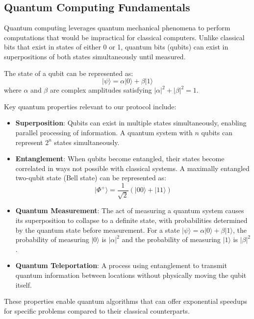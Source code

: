 \documentclass[11pt,a4paper]{article}
\begin{document}
\subsection{Quantum Computing Fundamentals}
Quantum computing leverages quantum mechanical phenomena to perform computations that would be impractical for classical computers. Unlike classical bits that exist in states of either 0 or 1, quantum bits (\glspl{qubit}) can exist in superpositions of both states simultaneously until measured.

The state of a \gls{qubit} can be represented as:
\begin{equation}
|\psi\rangle = \alpha|0\rangle + \beta|1\rangle
\end{equation}
where $\alpha$ and $\beta$ are complex amplitudes satisfying $|\alpha|^2 + |\beta|^2 = 1$.

Key quantum properties relevant to our protocol include:

\begin{itemize}
    \item \textbf{Superposition}: Qubits can exist in multiple states simultaneously, enabling parallel processing of information. A quantum system with $n$ qubits can represent $2^n$ states simultaneously.
    
    \item \textbf{Entanglement}: When qubits become entangled, their states become correlated in ways not possible with classical systems. A maximally entangled two-qubit state (Bell state) can be represented as:
    \begin{equation}
    |\Phi^+\rangle = \frac{1}{\sqrt{2}}(|00\rangle + |11\rangle)
    \end{equation}
    
    \item \textbf{Quantum Measurement}: The act of measuring a quantum system causes its superposition to collapse to a definite state, with probabilities determined by the quantum state before measurement. For a state $|\psi\rangle = \alpha|0\rangle + \beta|1\rangle$, the probability of measuring $|0\rangle$ is $|\alpha|^2$ and the probability of measuring $|1\rangle$ is $|\beta|^2$.
    
    \item \textbf{Quantum Teleportation}: A process using entanglement to transmit quantum information between locations without physically moving the qubit itself.
\end{itemize}

These properties enable quantum algorithms that can offer exponential speedups for specific problems compared to their classical counterparts.
\end{document}
